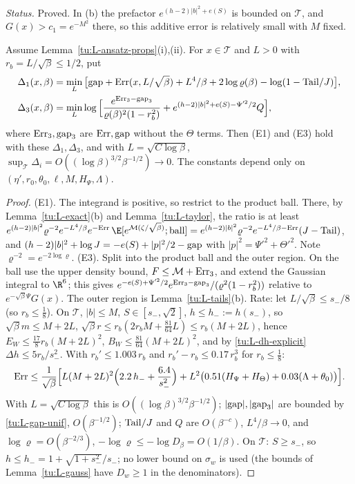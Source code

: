 \noindent\emph{Status.} Proved. In (b) the prefactor $e^{(h-2)|b|^2+e(S)}$ is bounded on $\mathcal T$, and
$G(x)>c_1=e^{-M^2}$ there, so this additive error is relatively small with $M$ fixed.

\begin{proposition}[(E1) and (E3)]\label{tu:L-E13}
Assume Lemma~\ref{tu:L-ansatz-props}(i),(ii). For $x\in\mathcal T$ and $L>0$ with $r_b=L/\sqrt\beta\le1/2$, put
\begin{align*}
\Delta_1(x,\beta)&=\min_L\big[{\rm gap}+{\rm Err}(x,L/\sqrt\beta)+L^4/\beta+2\log\varrho(\beta)-\log(1-{\rm Tail}/J)\big],\\
\Delta_3(x,\beta)&=\min_L\log\Big[\frac{e^{{\rm Err}_3-{\rm gap}_3}}{\varrho(\beta)^2(1-r_b^2)}+e^{(h-2)|b|^2+e(S)-\Psi'^2/2}Q\Big],
\end{align*}
where ${\rm Err}_3,{\rm gap}_3$ are ${\rm Err},{\rm gap}$ without the $\Theta$ terms. Then (E1) and (E3) hold
with these $\Delta_1,\Delta_3$, and with $L=\sqrt{C\log\beta}$,
$\sup_{\mathcal T}\Delta_i=O((\log\beta)^{3/2}\beta^{-1/2})\to0$. The constants depend only on
$(\eta',r_0,\theta_0,\ell,M,H_\Psi,\Lambda)$.
\end{proposition}

\begin{proof}
(E1). The integrand is positive, so restrict to the product ball. There, by Lemma~\ref{tu:L-exact}(b) and
Lemma~\ref{tu:L-taylor}, the ratio is at least
$e^{(h-2)|b|^2}\varrho^{-2}e^{-L^4/\beta}e^{-{\rm Err}}\,\E[e^{\mathcal M(\zeta/\sqrt\beta)};\text{ball}]
=e^{(h-2)|b|^2}\varrho^{-2}e^{-L^4/\beta-{\rm Err}}(J-{\rm Tail})$, and
$(h-2)|b|^2+\log J=-e(S)+|p|^2/2-{\rm gap}$ with $|p|^2=\Psi'^2+\Theta'^2$. Note $\varrho^{-2}=e^{-2\log\varrho}$.
(E3). Split into the product ball and the outer region. On the ball use the upper density bound, $F\le\mathcal M+{\rm Err}_3$,
and extend the Gaussian integral to $\R^6$; this gives $e^{-e(S)+\Psi'^2/2}e^{{\rm Err}_3-{\rm gap}_3}/(\varrho^2(1-r_b^2))$
relative to $e^{-\sqrt\beta\Psi}G(x)$. The outer region is Lemma~\ref{tu:L-tails}(b).
Rate: let $L/\sqrt\beta\le s_-/8$ (so $r_b\le\frac18$). On $\mathcal T$, $|b|\le M$, $S\in[s_-,\sqrt2]$, $h\le h_-:=h(s_-)$, so
$\sqrt\beta m\le M+2L$, $\sqrt\beta r\le r_b(2r_bM+\frac{81}{64}L)\le r_b(M+2L)$, hence $E_W\le\frac{17}8r_b(M+2L)^2$,
$B_W\le\frac{81}{64}(M+2L)^2$, and by \eqref{tu:L-dh-explicit} $\Delta h\le5r_b/s_-^2$. With $r_b'\le1.003\,r_b$ and
$r_b'-r_b\le0.17\,r_b^3$ for $r_b\le\frac18$:
\begin{equation}\label{tu:L-err-explicit}
{\rm Err}\le\frac1{\sqrt\beta}\Big[L(M+2L)^2\Big(2.2\,h_-+\frac{6.4}{s_-^2}\Big)+L^2\big(0.51(H_\Psi+H_\Theta)+0.03(\Lambda+\theta_0)\big)\Big].
\end{equation}
With $L=\sqrt{C\log\beta}$ this is $O((\log\beta)^{3/2}\beta^{-1/2})$; $|{\rm gap}|,|{\rm gap}_3|$ are bounded by
\eqref{tu:L-gap-unif}, $O(\beta^{-1/2})$; ${\rm Tail}/J$ and $Q$ are $O(\beta^{-c})$, $L^4/\beta\to0$, and
$\log\varrho=O(\beta^{-2/3})$, $-\log\varrho\le-\log D_\beta=O(1/\beta)$. On $\mathcal T$: $S\ge s_-$, so
$h\le h_-=1+\sqrt{1+s_-^2}/s_-$; no lower bound on $\sigma_w$ is used (the bounds of Lemma~\ref{tu:L-gauss} have $D_w\ge1$
in the denominators).
\end{proof}

